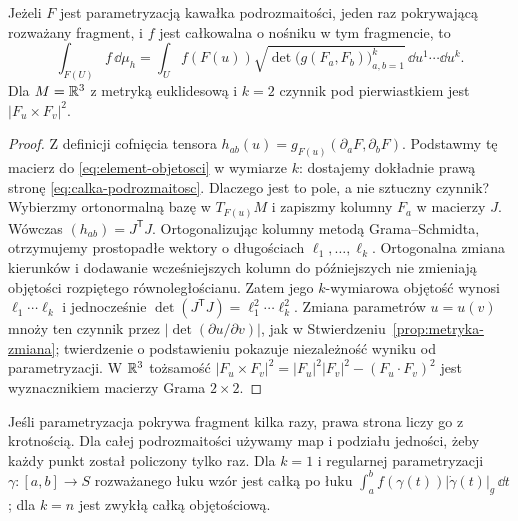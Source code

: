 \begin{twierdzenie}
\label{thm:calka-podrozmaitosc}
Jeżeli $F$ jest parametryzacją kawałka
podrozmaitości, jeden raz pokrywającą
rozważany fragment, i $f$ jest całkowalna
o nośniku w tym fragmencie, to
\begin{equation}\label{eq:calka-podrozmaitosc}
 \int_{F(U)}f\,\dd\mu_h
 =\int_U f(F(u))
   \sqrt{\det\bigl(g(F_a,F_b)\bigr)_{a,b=1}^k}
                      \,\dd u^1\cdots\dd u^k .
\end{equation}
Dla $M=\mathbb{R}^3$ z metryką euklidesową i $k=2$ czynnik pod pierwiastkiem
jest $|F_u\times F_v|^2$.
\end{twierdzenie}
\begin{proof}
Z definicji cofnięcia tensora
$h_{ab}(u)=g_{F(u)}(\partial_aF,\partial_bF)$.
Podstawmy tę macierz do
\eqref{eq:element-objetosci} w wymiarze $k$:
dostajemy dokładnie prawą stronę
\eqref{eq:calka-podrozmaitosc}.
Dlaczego jest to pole, a nie sztuczny czynnik?
Wybierzmy ortonormalną bazę w $T_{F(u)}M$
i zapiszmy kolumny $F_a$ w macierzy $J$.
Wówczas $(h_{ab})=J^{\mathsf T}J$.
Ortogonalizując kolumny metodą Grama--Schmidta,
otrzymujemy prostopadłe wektory o długościach
$\ell_1,\ldots,\ell_k$. Ortogonalna zmiana
kierunków i dodawanie wcześniejszych kolumn
do późniejszych nie zmieniają objętości
rozpiętego równoległościanu. Zatem jego
$k$-wymiarowa objętość wynosi
$\ell_1\cdots\ell_k$ i jednocześnie
$\det(J^{\mathsf T}J)=\ell_1^2\cdots\ell_k^2$.
Zmiana parametrów $u=u(v)$ mnoży ten czynnik
przez $|\det(\partial u/\partial v)|$,
jak w Stwierdzeniu~\ref{prop:metryka-zmiana};
twierdzenie o podstawieniu pokazuje
niezależność wyniku od parametryzacji.
W $\mathbb{R}^3$ tożsamość
$|F_u\times F_v|^2
=|F_u|^2|F_v|^2-(F_u\cdot F_v)^2$
jest wyznacznikiem macierzy Grama $2\times2$.
\end{proof}

Jeśli parametryzacja pokrywa fragment kilka
razy, prawa strona liczy go z krotnością.
Dla całej podrozmaitości używamy map
i podziału jedności, żeby każdy punkt
został policzony tylko raz. Dla $k=1$ i regularnej
parametryzacji $\gamma:[a,b]\to S$ rozważanego łuku
wzór jest całką po łuku
$\int_a^b f(\gamma(t))|\dot\gamma(t)|_g\,\dd t$;
dla $k=n$ jest zwykłą całką objętościową.

